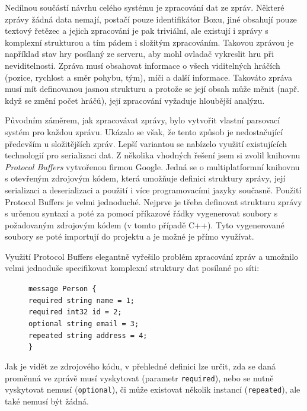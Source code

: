 \documentclass[thesis=B,czech,hidelinks]{FITthesis}[2012/06/26] %
\newcommand{\code}[1]{\texttt{#1}}
\newcommand\tab[1][1cm]{\hspace*{#1}}
\begin{document}
Nedílnou součástí návrhu celého systému je zpracování dat ze zpráv. Některé zprávy žádná data nemají, postačí pouze identifikátor Boxu, jiné obsahují pouze textový řetězec a jejich zpracování je pak triviální, ale existují i zprávy s komplexní strukturou a tím pádem i složitým zpracováním. Takovou zprávou je například stav hry posílaný ze serveru, aby mohl ovladač vykreslit hru při neviditelnosti. Zpráva musí obsahovat informace o všech viditelných hráčích (pozice, rychlost a směr pohybu, tým), míči a další informace. Takováto zpráva musí mít definovanou jasnou strukturu a protože se její obsah může měnit (např. když se změní počet hráčů), její zpracování vyžaduje hloubější analýzu.

Původním záměrem, jak zpracovávat zprávy, bylo vytvořit vlastní parsovací systém pro každou zprávu. Ukázalo se však, že tento způsob je nedostačující především u složitějších zpráv. Lepší variantou se nabízelo využití existujících technologií pro serializaci dat. Z několika vhodných řešení jsem si zvolil knihovnu \textit{Protocol Buffers} vytvořenou firmou Google. Jedná se o multiplatformní knihovnu s otevřeným zdrojovým kódem, která umožňuje definici struktury zprávy, její serializaci a deserializaci a použití i více programovacími jazyky současně. \cite{protobuf} Použití Protocol Buffers je velmi jednoduché. Nejprve je třeba definovat strukturu zprávy s určenou syntaxí a poté za pomocí příkazové řádky vygenerovat soubory s požadovaným zdrojovým kódem (v tomto případě C++). Tyto vygenerované soubory se poté importují do projektu a je možné je přímo využívat.

Využití Protocol Buffers elegantně vyřešilo problém zpracování zpráv a umožnilo velmi jednoduše specifikovat komplexní struktury dat posílané po síti:

\begin{figure}[h]
\code{message Person \{ \\
\tab required string name = 1; \\
\tab required int32 id = 2; \\
\tab optional string email = 3; \\
\tab repeated string address = 4; \\
\}}
\end{figure}

Jak je vidět ze zdrojového kódu, v přehledné definici lze určit, zda se daná proměnná ve zprávě musí vyskytovat (parametr \code{required}), nebo se nutně vyskytovat nemusí (\code{optional}), či může existovat několik instancí (\code{repeated}), ale také nemusí být žádná.
\end{document}
